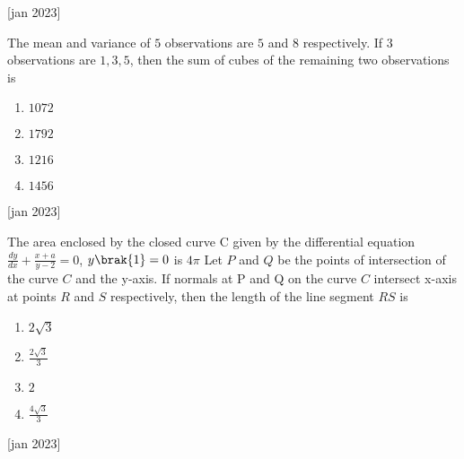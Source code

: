 \hfill{[jan 2023]}
\item The mean and variance of $5$ observations are $5$ and 
$8$ respectively. If $3$ observations are $1, 3, 5$, then 
the sum of cubes of the remaining two 
observations is
\begin{enumerate}
    \item $1072$
    \item $1792$
    \item $1216$
    \item $1456$
\end{enumerate}
\hfill{[jan 2023]}
\item The area enclosed by the closed curve C given by 
the differential equation 
$\frac{dy}{dx}+\frac{x+a}{y-2}=0$, $y\brak{1}=0$ is $4\pi$
 Let $P$ and $Q$ be the points of intersection of the 
curve $C$ and the y-axis. If normals at P and Q on 
the curve $C$ intersect x-axis at points $R$ and $S$ 
respectively, then the length of the line segment 
$RS$ is
\begin{enumerate}
    \item $2\sqrt{3}$
    \item $\frac{2\sqrt{3}}{3}$
    \item $2$
    \item $\frac{4\sqrt{3}}{3}$
\end{enumerate}
\hfill{[jan 2023]}
